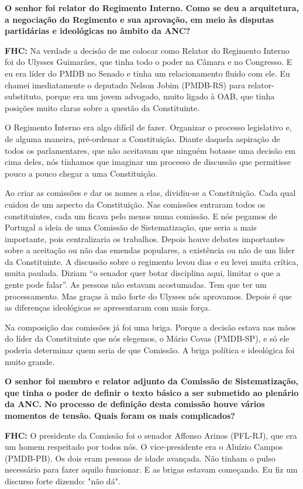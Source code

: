 \textbf{O senhor foi relator do Regimento Interno. Como se deu a
arquitetura, a negociação do Regimento e sua aprovação, em meio às
disputas partidárias e ideológicas no âmbito da ANC?}

\textbf{FHC:} Na verdade a decisão de me colocar como Relator do
Regimento Interno foi do Ulysses Guimarães, que tinha todo o poder na
Câmara e no Congresso. E eu era líder do PMDB no Senado e tinha um
relacionamento fluido com ele. Eu chamei imediatamente o deputado Nelson
Jobim (PMDB-RS) para relator-substituto, porque era um jovem advogado,
muito ligado à OAB, que tinha posições muito claras sobre a questão da
Constituinte.

O Regimento Interno era algo difícil de fazer. Organizar o processo
legislativo e, de alguma maneira, pré-ordenar a Constituição. Diante
daquela aspiração de todos os parlamentares, que não aceitavam que
ninguém botasse uma decisão em cima deles, nós tínhamos que imaginar um
processo de discussão que permitisse pouco a pouco chegar a uma
Constituição.

Ao criar as comissões e dar os nomes a elas, dividiu-se a Constituição.
Cada qual cuidou de um aspecto da Constituição. Nas comissões entraram
todos os constituintes, cada um ficava pelo menos numa comissão. E nós
pegamos de Portugal a ideia de uma Comissão de Sistematização, que seria
a mais importante, pois centralizaria os trabalhos. Depois houve debates
importantes sobre a aceitação ou não das emendas populares, a existência
ou não de um líder da Constituinte. A discussão sobre o regimento levou
dias e eu levei muita crítica, muita paulada. Diziam ``o senador quer
botar disciplina aqui, limitar o que a gente pode falar''. As pessoas
não estavam acostumadas. Tem que ter um processamento. Mas graças à mão
forte do Ulysses nós aprovamos. Depois é que as diferenças ideológicas
se apresentaram com mais força.

Na composição das comissões já foi uma briga. Porque a decisão estava
nas mãos do líder da Constituinte que nós elegemos, o Mário Covas
(PMDB-SP), e só ele poderia determinar quem seria de que Comissão. A
briga política e ideológica foi muito grande.

\textbf{O senhor foi membro e relator adjunto da Comissão de
Sistematização, que tinha o poder de definir o texto básico a ser
submetido ao plenário da ANC. No processo de definição desta comissão
houve vários momentos de tensão. Quais foram os mais complicados?}

\textbf{FHC:} O presidente da Comissão foi o senador Affonso Arinos
(PFL-RJ), que era um homem respeitado por todos nós. O vice-presidente
era o Aluízio Campos (PMDB-PB). Os dois eram pessoas de idade avançada.
Não tinham o pulso necessário para fazer aquilo funcionar. E as brigas
estavam começando. Eu fiz um discurso forte dizendo: "não dá".

